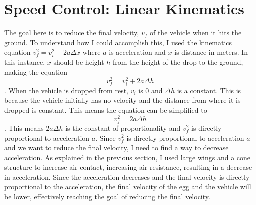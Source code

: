 \documentclass[12pt]{report}
\begin{document}
\section{Speed Control: Linear Kinematics}
The goal here is to reduce the final velocity, $v_f$ of the vehicle when it hits the ground. To understand how I could accomplish this, I used the kinematics equation $v_f^2 = v_i^2 + 2a\Delta x$ where $a$ is acceleration and $x$ is distance in meters. In this instance, $x$ should be height $h$ from the height of the drop to the ground, making the equation 
\begin{equation} \label{eq:2}
v_f^2 = v_i^2 + 2a\Delta h
\end{equation}. When the vehicle is dropped from rest, $v_i$ is 0 and $\Delta h$ is a constant. This is because the vehicle initially has no velocity and the distance from where it is dropped is constant. This means the equation can be simplified to 
\begin{equation} \label{eq:3}
v_f^2 = 2a\Delta h
\end{equation} 
.  This means $2a\Delta h$ is the constant of proportionality and $v_f^2$ is directly proportional to acceleration $a$.
Since $v_f^2$ is directly proportional to acceleration $a$ and we want to reduce the final velocity, I need to find a way to decrease acceleration.\newline \newline
As explained in the previous section, I used large wings and a cone structure to increase air contact, increasing air resistance, resulting in a decrease in acceleration. Since the acceleration decreases and the final velocity is directly proportional to the acceleration, the final velocity of the egg and the vehicle will be lower, effectively reaching the goal of reducing the final velocity.
\end{document}
